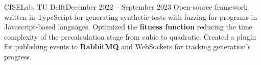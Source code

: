     {CISELab, TU Delft}{December 2022 -- September 2023}
    \vspace{6pt}
    \scriptsize { \small{\newline{}Open-source framework written in TypeScript for generating synthetic tests with fuzzing for programs in Javascript-based languages.}}
    \vspace{-4pt}
    \resumeItemListStart
        \subItemOfItem
        {Optimized the \textbf{fitness function} reducing the time complexity of the precalculation stage from cubic to quadratic.}
        \subItemOfItem
        {Created a plugin for publishing events to \textbf{RabbitMQ} and WebSockets for tracking generation's progress.}
    \resumeItemListEnd